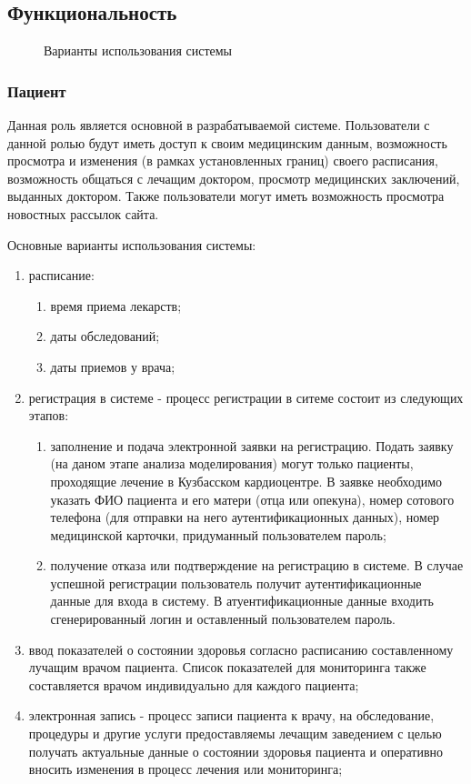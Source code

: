 \subsection{Функциональность}
\begin{figure}[h]
\caption{Варианты использования системы}
\label{ris:main_use_case}
\end{figure}

\subsubsection{Пациент}
Данная роль является основной в разрабатываемой системе. Пользователи с данной
ролью будут иметь доступ к своим медицинским данным, возможность просмотра и
изменения (в рамках установленных границ) своего расписания, возможность
общаться с лечащим доктором, просмотр медицинских заключений, выданных доктором.
Также пользователи могут иметь возможность просмотра новостных рассылок сайта.

Основные варианты использования системы:

\begin{enumerate}
  \item расписание:
  \begin{enumerate}
    \item время приема лекарств;
    \item даты обследований;
    \item даты приемов у врача;     
  \end{enumerate}
  \item регистрация в системе - процесс регистрации в ситеме состоит из
  следующих этапов:
  \begin{enumerate}
    \item заполнение и подача электронной заявки на регистрацию. Подать заявку
    (на даном этапе анализа моделирования) могут только пациенты, проходящие
    лечение в Кузбасском кардиоцентре. 
    В заявке необходимо указать ФИО пациента и его матери (отца или опекуна), номер сотового телефона (для отправки на него аутентификационных данных), номер медицинской карточки, придуманный пользователем пароль;
    \item получение отказа или подтверждение на регистрацию в системе. В случае
    успешной регистрации пользователь получит аутентификационные данные для
    входа в систему. В атуентификационные данные входить сгенерированный логин и
    оставленный пользователем пароль.
  \end{enumerate}
  \item ввод показателей о состоянии здоровья согласно расписанию составленному
лучащим врачом пациента. Список показателей для мониторинга также составляется
врачом индивидуально для каждого пациента;
  \item электронная запись - процесс записи пациента к врачу, на обследование,
процедуры и другие услуги предоставляемы лечащим заведением с целью получать
актуальные данные о состоянии здоровья пациента и оперативно вносить изменения в процесс лечения или мониторинга;
\end{enumerate}

